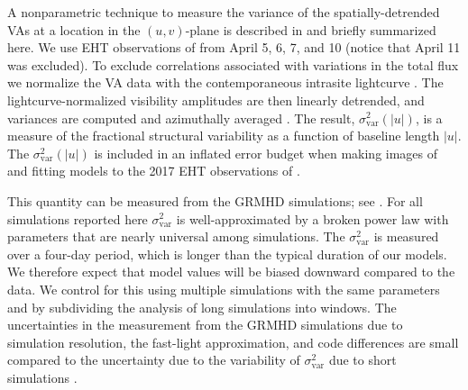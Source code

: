 A nonparametric technique to measure the variance of the spatially-detrended VAs at a location in the $(u,v)$-plane is described in \citet{NoiseModeling} and briefly summarized here.  We use EHT observations of \sgra from April 5, 6, 7, and 10 (notice that April 11 was excluded).  To exclude correlations associated with  variations in the total flux we normalize the VA data with the contemporaneous intrasite lightcurve \citep{Georgiev_2022}.  The lightcurve-normalized visibility amplitudes are then linearly detrended, and variances are computed and azimuthally averaged \citep{NoiseModeling}.  The result, $\sigma_\text{var}^2 (|u|)$, is a measure of the fractional structural variability as a function of baseline length $|u|$.  The $\sigma_\text{var}^2 (|u|)$ is included in an inflated error budget when making images of and fitting models to the 2017 EHT observations of \sgra {}.

This quantity can be measured from the GRMHD simulations; see \citet{Georgiev_2022}. For all simulations reported here $\sigma_\text{var}^2$ is well-approximated by a broken power law with parameters that are nearly universal among simulations.
The $\sigma_\text{var}^2$ is measured over a four-day period, which is longer than the typical duration of our models.  We therefore expect that model values will be biased downward compared to the data.  We control for this using multiple simulations with the same parameters and by subdividing the analysis of long simulations into windows.
The uncertainties in the measurement from the GRMHD simulations due to simulation resolution, the fast-light approximation, and code differences are small compared to the uncertainty due to the variability of $\sigma_\text{var}^2$ due to short simulations \citep{Georgiev_2022}.



